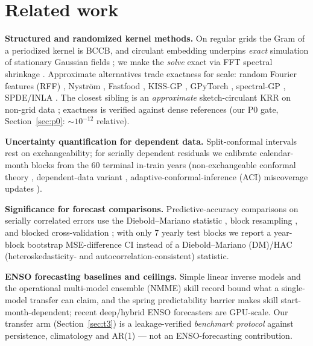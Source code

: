 \documentclass{article}
\begin{document}
\section{Related work}
\label{sec:rel}

\textbf{Structured and randomized kernel methods.} On regular grids the Gram
of a periodized kernel is BCCB, and circulant embedding underpins
\emph{exact} simulation of stationary Gaussian fields
\cite{dietrich1997fast,wood1994statistical}; we make the \emph{solve} exact
via FFT spectral shrinkage \cite{gray2006toeplitz}. Approximate alternatives trade exactness for
scale: random Fourier features (RFF) \cite{rahimi2007random}, Nystr\"om
\cite{williams2001using,drineas2005nystrom}, Fastfood \cite{le2013fastfood},
KISS-GP \cite{wilson2015kernel}, GPyTorch \cite{gardner2018gpyTorch},
spectral-GP \cite{lazaro2010sparse}, SPDE/INLA \cite{lindgren2011explicit}.
The closest sibling is an
\emph{approximate} sketch-circulant KRR on non-grid data
\cite{yin2019sketch}; exactness is verified against dense references
\cite{dietrich1997fast} (our P0 gate, Section~\ref{sec:p0}: $\sim\!10^{-12}$
relative).

\textbf{Uncertainty quantification for dependent data.} Split-conformal
intervals rest on exchangeability; for serially dependent residuals we
calibrate calendar-month blocks from the 60 terminal in-train years
(non-exchangeable conformal theory \cite{barber2023conformal},
dependent-data variant \cite{chernozhukov2018exact},
adaptive-conformal-inference (ACI) miscoverage updates
\cite{gibbs2021adaptive}).

\textbf{Significance for forecast comparisons.} Predictive-accuracy
comparisons on serially correlated errors use the Diebold--Mariano
statistic \cite{diebold1995comparing}, block resampling
\cite{kunsch1989jackknife}, and blocked cross-validation
\cite{bergmeir2012use,roberts2017crossvalidation,valavi2019blockcv};
with only 7 yearly test blocks we report a year-block bootstrap
MSE-difference CI instead of a Diebold--Mariano (DM)/HAC
(heteroskedasticity- and autocorrelation-consistent) statistic.

\textbf{ENSO forecasting baselines and ceilings.} Simple linear inverse
models \cite{penland1993prediction} and the operational multi-model
ensemble (NMME) skill record \cite{barnston2012skill,kirtman2014nmme}
bound what a single-model
transfer can claim, and the spring predictability barrier
\cite{webster1992monsoon} makes skill start-month-dependent; recent
deep/hybrid ENSO forecasters \cite{ham2019deep,zhou2022hybrid} are
GPU-scale. Our transfer arm (Section~\ref{sec:t3}) is a leakage-verified
\emph{benchmark protocol} against persistence, climatology and AR(1) --- not
an ENSO-forecasting contribution.
\end{document}

